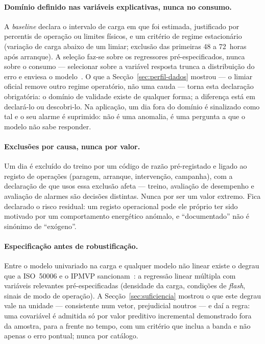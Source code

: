 \paragraph{Domínio definido nas variáveis explicativas, nunca no consumo.} A
\emph{baseline} declara o intervalo de carga em que foi estimada, justificado
por percentis de operação ou limites físicos, e um critério de regime
estacionário (variação de carga abaixo de um limiar; exclusão das primeiras
48 a 72~horas após arranque). A seleção faz-se sobre os regressores
pré-especificados, nunca sobre o consumo --- selecionar sobre a variável
resposta trunca a distribuição do erro e enviesa o modelo~\cite{Heckman1979}. O que a
Secção~\ref{sec:perfil-dados} mostrou --- o limiar oficial remove outro
regime operatório, não uma cauda --- torna esta declaração obrigatória: o
domínio de validade existe de qualquer forma; a diferença está em declará-lo
ou descobri-lo. Na aplicação, um dia fora do domínio é sinalizado como tal
e o seu alarme é suprimido: não é uma anomalia, é uma pergunta a que o
modelo não sabe responder.

\paragraph{Exclusões por causa, nunca por valor.} Um dia é excluído do treino
por um código de razão pré-registado e ligado ao registo de operações
(paragem, arranque, intervenção, campanha), com a declaração de que usos
essa exclusão afeta --- treino, avaliação de desempenho e avaliação de
alarmes são decisões distintas. Nunca por ser um valor extremo. Fica
declarado o risco residual: um registo operacional pode ele próprio ter sido
motivado por um comportamento energético anómalo, e ``documentado'' não é
sinónimo de ``exógeno''.

\paragraph{Especificação antes de robustificação.} Entre o modelo univariado
na carga e qualquer modelo não linear existe o degrau que a ISO~50006 e o
IPMVP sancionam~\cite{ISO50006_2014,IPMVP_2022}: a regressão linear múltipla com variáveis relevantes
pré-especificadas (densidade da carga, condições de \emph{flash}, sinais de
modo de operação). A Secção~\ref{sec:suficiencia} mostrou o que este degrau
vale na unidade --- consistente num vetor, prejudicial noutros --- e daí a
regra: uma covariável é admitida só por valor preditivo incremental
demonstrado fora da amostra, para a frente no tempo, com um critério que
inclua a banda e não apenas o erro pontual; nunca por catálogo.

